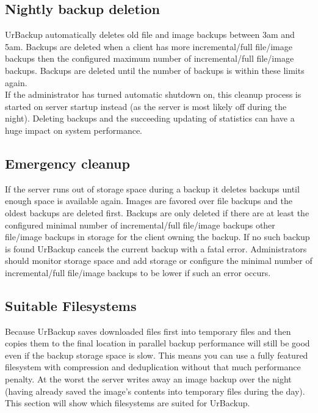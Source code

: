 \documentclass[a4paper,10pt]{article}
\begin{document}
\subsection{Nightly backup deletion}

UrBackup automatically deletes old file and image backups between 3am and 5am. Backups are deleted when a client has more incremental/full file/image backups then the configured maximum number of incremental/full file/image backups. Backups are deleted until the number of backups is within these limits again.\\
If the administrator has turned automatic shutdown on, this cleanup process is started on server startup instead (as the server is most likely off during the night). Deleting backups and the succeeding updating of statistics can have a huge impact on system performance.

\subsection{Emergency cleanup}

If the server runs out of storage space during a backup it deletes backups until enough space is available again. Images are favored over file backups and the oldest backups are deleted first. Backups are only deleted if there are at least the configured minimal number of incremental/full file/image backups other file/image backups in storage for the client owning the backup. If no such backup is found UrBackup cancels the current backup with a fatal error. Administrators should monitor storage space and add storage or configure the minimal number of incremental/full file/image backups to be lower if such an error occurs. 

\subsection{Suitable Filesystems}
\label{subsec_filesystems}

Because UrBackup saves downloaded files first into temporary files and then copies them to the final location in parallel backup performance will still be good even if the backup storage space is slow. This means you can use a fully featured filesystem with compression and deduplication without that much performance penalty. At the worst the server writes away an image backup over the night (having already saved the image's contents into temporary files during the day). This section will show which filesystems are suited for UrBackup.
\end{document}
